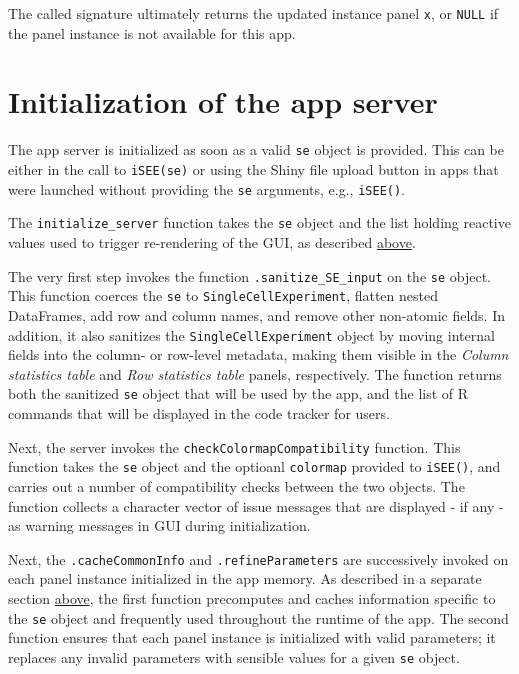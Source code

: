\documentclass[]{book}
\begin{document}
The called signature ultimately returns the updated instance panel \texttt{x}, or \texttt{NULL} if the panel instance is not available for this app.

\hypertarget{initialization-of-the-app-server}{%
\section{Initialization of the app server}\label{initialization-of-the-app-server}}

The app server is initialized as soon as a valid \texttt{se} object is provided.
This can be either in the call to \texttt{iSEE(se)} or using the Shiny file upload button in apps that were launched without providing the \texttt{se} arguments, e.g., \texttt{iSEE()}.

The \texttt{initialize\_server} function takes the \texttt{se} object and the list holding reactive values used to trigger re-rendering of the GUI, as described \protect\hyperlink{robjects}{above}.

The very first step invokes the function \texttt{.sanitize\_SE\_input} on the \texttt{se} object.
This function coerces the \texttt{se} to \texttt{SingleCellExperiment}, flatten nested DataFrames, add row and column names, and remove other non-atomic fields.
In addition, it also sanitizes the \texttt{SingleCellExperiment} object by moving internal fields into the column- or row-level metadata, making them visible in the \emph{Column statistics table} and \emph{Row statistics table} panels, respectively. The function returns both the sanitized \texttt{se} object that will be used by the app, and the list of R commands that will be displayed in the code tracker for users.

Next, the server invokes the \texttt{checkColormapCompatibility} function.
This function takes the \texttt{se} object and the optioanl \texttt{colormap} provided to \texttt{iSEE()}, and carries out a number of compatibility checks between the two objects.
The function collects a character vector of issue messages that are displayed - if any - as warning messages in GUI during initialization.

Next, the \texttt{.cacheCommonInfo} and \texttt{.refineParameters} are successively invoked on each panel instance initialized in the app memory.
As described in a separate section \protect\hyperlink{panel-api}{above}, the first function precomputes and caches information specific to the \texttt{se} object and frequently used throughout the runtime of the app.
The second function ensures that each panel instance is initialized with valid parameters; it replaces any invalid parameters with sensible values for a given \texttt{se} object.
\end{document}
